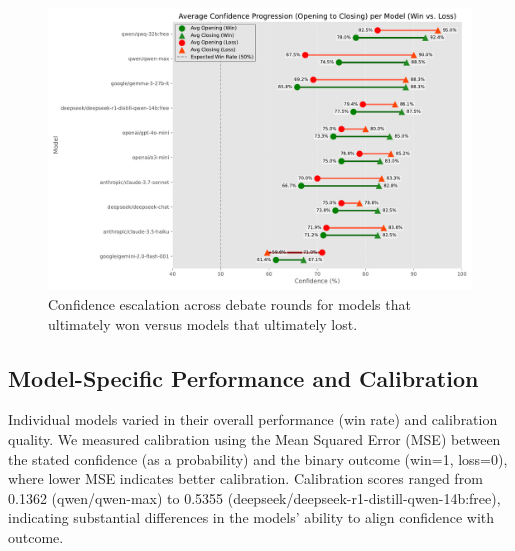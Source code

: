 \documentclass{article}
\begin{document}
\begin{figure}[h]
  \centering
  \includegraphics[width=0.9\linewidth]{figures/model_win_loss_escalation_dumbell.pdf}
  \caption{Confidence escalation across debate rounds for models that ultimately won versus models that ultimately lost.}
  \label{fig:confidence_trend_winner_loser}
\end{figure}

\subsection{Model-Specific Performance and Calibration}

Individual models varied in their overall performance (win rate) and calibration quality. We measured calibration using the Mean Squared Error (MSE) between the stated confidence (as a probability) and the binary outcome (win=1, loss=0), where lower MSE indicates better calibration. Calibration scores ranged from 0.1362 (qwen/qwen-max) to 0.5355 (deepseek/deepseek-r1-distill-qwen-14b:free), indicating substantial differences in the models' ability to align confidence with outcome.
\end{document}
